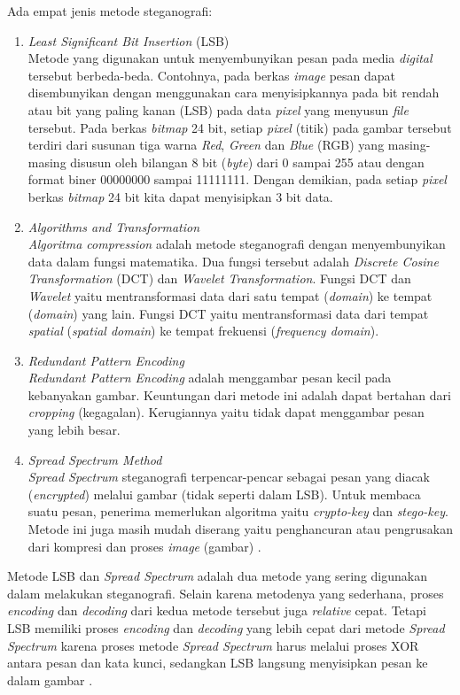 	Ada empat jenis metode steganografi:
	\begin{enumerate}
		\item \emph{Least Significant Bit Insertion} (LSB)\\
		Metode yang digunakan untuk menyembunyikan pesan pada media \emph{digital} tersebut berbeda-beda. Contohnya, pada berkas \emph{image} pesan dapat disembunyikan dengan menggunakan cara menyisipkannya pada bit rendah atau bit yang paling kanan (LSB) pada data \emph{pixel} yang menyusun \emph{file} tersebut. Pada berkas \emph{bitmap} 24 bit, setiap \emph{pixel} (titik) pada gambar tersebut terdiri dari susunan tiga warna \emph{Red}, \emph{Green} dan \emph{Blue} (RGB) yang masing-masing disusun oleh bilangan 8 bit (\emph{byte}) dari 0 sampai 255 atau dengan format biner 00000000 sampai 11111111. Dengan demikian, pada setiap \emph{pixel} berkas \emph{bitmap} 24 bit kita dapat menyisipkan 3 bit data. 
		\item \emph{Algorithms and Transformation}\\
		\emph{Algoritma compression} adalah metode steganografi dengan menyembunyikan data dalam fungsi matematika. Dua fungsi tersebut adalah \emph{Discrete Cosine Transformation} (DCT) dan \emph{Wavelet Transformation}. Fungsi DCT dan \emph{Wavelet} yaitu mentransformasi data dari satu tempat (\emph{domain}) ke tempat (\emph{domain}) yang lain. Fungsi DCT yaitu mentransformasi data dari tempat \emph{spatial} (\emph{spatial domain}) ke tempat frekuensi (\emph{frequency domain}).
		\item \emph{Redundant Pattern Encoding}\\
		\emph{Redundant Pattern Encoding} adalah menggambar pesan kecil pada kebanyakan gambar. Keuntungan dari metode ini adalah dapat bertahan dari \emph{cropping} (kegagalan). Kerugiannya yaitu tidak dapat menggambar pesan yang lebih besar.
		\item \emph{Spread Spectrum Method}\\
		\emph{Spread Spectrum} steganografi terpencar-pencar sebagai pesan yang diacak (\emph{encrypted}) melalui gambar (tidak seperti dalam LSB). Untuk membaca suatu pesan, penerima memerlukan algoritma yaitu \emph{crypto-key} dan \emph{stego-key}. Metode ini juga masih mudah diserang yaitu penghancuran atau pengrusakan dari kompresi dan proses \emph{image} (gambar) \cite{wikipedia1}.
	\end{enumerate}

	Metode LSB dan \emph{Spread Spectrum} adalah dua metode yang sering digunakan dalam melakukan steganografi. Selain karena metodenya yang sederhana, proses \emph{encoding} dan \emph{decoding} dari kedua metode tersebut juga \emph{relative} cepat\cite{pavani}. Tetapi LSB memiliki proses \emph{encoding} dan \emph{decoding} yang lebih cepat dari metode \emph{Spread Spectrum} karena proses metode \emph{Spread Spectrum} harus melalui proses XOR antara pesan dan kata kunci, sedangkan LSB langsung menyisipkan pesan ke dalam gambar \cite{pakereng}.
	

